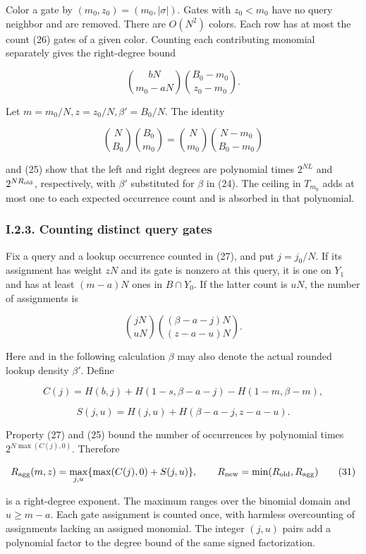 Color a gate by \((m_0,z_0)=(m_0,|\sigma|)\). Gates with \(z_0<m_0\) have no query neighbor and are removed. There are \(O(N^2)\) colors. Each row has at most the count (26) gates of a given color. Counting each contributing monomial separately gives the right-degree bound

\[
\binom{bN}{m_0-aN}\binom{B_0-m_0}{z_0-m_0}.
\tag{29}
\]

Let \(m=m_0/N,z=z_0/N,\beta'=B_0/N\). The identity

\[
\binom N{B_0}\binom{B_0}{m_0}
 =\binom N{m_0}\binom{N-m_0}{B_0-m_0}
\]

and (25) show that the left and right degrees are polynomial times \(2^{NL}\) and \(2^{NR_{\rm old}}\), respectively, with \(\beta'\) substituted for \(\beta\) in (24). The ceiling in \(T_{m_0}\) adds at most one to each expected occurrence count and is absorbed in that polynomial.

\hypertarget{af-a9ec399514-i.2.3.-counting-distinct-query-gates}{%
\subsubsection{I.2.3. Counting distinct query gates}\label{af-a9ec399514-i.2.3.-counting-distinct-query-gates}}

Fix a query and a lookup occurrence counted in (27), and put \(j=j_0/N\). If its assignment has weight \(zN\) and its gate is nonzero at this query, it is one on \(Y_1\) and has at least \((m-a)N\) ones in \(B\cap Y_0\). If the latter count is \(uN\), the number of assignments is

\[
\binom{jN}{uN}\binom{(\beta-a-j)N}{(z-a-u)N}.
\]

Here and in the following calculation \(\beta\) may also denote the actual rounded lookup density \(\beta'\). Define

\[
C(j)=H(b,j)+H(1-s,\beta-a-j)-H(1-m,\beta-m),
\]

\[
S(j,u)=H(j,u)+H(\beta-a-j,z-a-u).
\tag{30}
\]

Property (27) and (25) bound the number of occurrences by polynomial times \(2^{N\max(C(j),0)}\). Therefore

\[
R_{\rm agg}(m,z)=\max_{j,u}\{\max(C(j),0)+S(j,u)\},\qquad
R_{\rm new}=\min(R_{\rm old},R_{\rm agg})
\tag{31}
\]

is a right-degree exponent. The maximum ranges over the binomial domain and \(u\ge m-a\). Each gate assignment is counted once, with harmless overcounting of assignments lacking an assigned monomial. The integer \((j,u)\) pairs add a polynomial factor to the degree bound of the same signed factorization.

